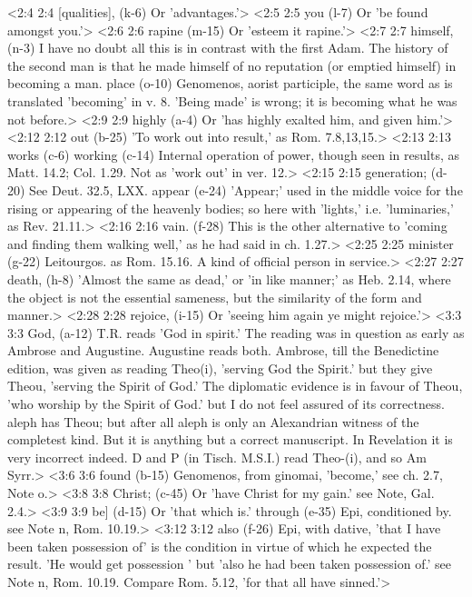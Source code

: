 <2:4 2:4  [qualities], (k-6)  Or 'advantages.'>
<2:5 2:5  you (l-7)  Or 'be found amongst you.'>
<2:6 2:6  rapine (m-15)  Or 'esteem it rapine.'>
<2:7 2:7  himself, (n-3)  I have no doubt all this is in contrast with the first Adam.  The history of the second man is that he made himself of no  reputation (or emptied himself) in becoming a man.
  place (o-10)  Genomenos, aorist participle, the same word as is  translated 'becoming' in v. 8. 'Being made' is wrong; it is  becoming what he was not before.>
<2:9 2:9  highly (a-4)  Or 'has highly exalted him, and given him.'>
<2:12 2:12  out (b-25)  'To work out into result,' as Rom. 7.8,13,15.>
<2:13 2:13  works (c-6)  working (c-14)
  Internal operation of power, though seen in results, as Matt.  14.2; Col. 1.29. Not as 'work out' in ver. 12.>
<2:15 2:15  generation; (d-20)  See Deut. 32.5, LXX.
  appear (e-24)  'Appear;' used in the middle voice for the rising or  appearing of the heavenly bodies; so here with 'lights,' i.e.  'luminaries,' as Rev. 21.11.>
<2:16 2:16  vain. (f-28)  This is the other alternative to 'coming and finding them  walking well,' as he had said in ch. 1.27.>
<2:25 2:25  minister (g-22)  Leitourgos. as Rom. 15.16. A kind of official person in  service.>
<2:27 2:27  death, (h-8)  'Almost the same as dead,' or 'in like manner;' as Heb. 2.14,  where the object is not the essential sameness, but the  similarity of the form and manner.>
<2:28 2:28  rejoice, (i-15)  Or 'seeing him again ye might rejoice.'>
<3:3 3:3  God, (a-12)  T.R. reads 'God in spirit.' The reading was in question as  early as Ambrose and Augustine. Augustine reads both. Ambrose,  till the Benedictine edition, was given as reading Theo(i),  'serving God the Spirit.' but they give Theou, 'serving the  Spirit of God.' The diplomatic evidence is in favour of  Theou, 'who worship by the Spirit of God.' but I do not feel  assured of its correctness. {aleph} has Theou; but after all  {aleph} is only an Alexandrian witness of the completest kind.  But it is anything but a correct manuscript. In Revelation it  is very incorrect indeed. D and P (in Tisch. M.S.I.) read  Theo-(i), and so Am Syrr.>
<3:6 3:6  found (b-15)  Genomenos, from ginomai, 'become,' see ch. 2.7, Note o.>
<3:8 3:8  Christ; (c-45)  Or 'have Christ for my gain.' see Note, Gal. 2.4.>
<3:9 3:9  be] (d-15)  Or 'that which is.'
  through (e-35)  Epi, conditioned by. see Note n, Rom. 10.19.>
<3:12 3:12  also (f-26)  Epi, with dative, 'that I have been taken possession of' is  the condition in virtue of which he expected the result. 'He  would get possession ' but 'also he had been taken possession  of.' see Note n, Rom. 10.19. Compare Rom. 5.12, 'for that all  have sinned.'>
